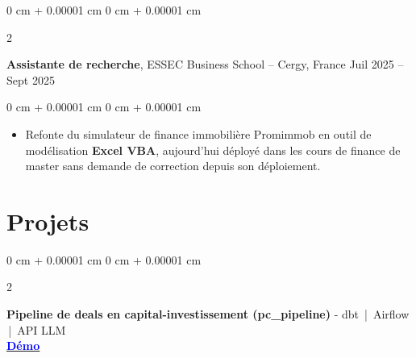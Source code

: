 \documentclass[10pt, letterpaper]{article}
\newenvironment{highlights}{
    \begin{itemize}[
        topsep=0.04 cm,
        parsep=0.02cm,
        partopsep=0pt,
        itemsep=0pt,
        leftmargin=0 cm + 10pt
    ]
}{
    \end{itemize}
} %
\newcommand{\stronglink}[2]{%
    \href{#1}{\textbf{\uline{\textcolor{blue}{#2}}}}%
}
\newenvironment{onecolentry}{
    \begin{adjustwidth}{
        0 cm + 0.00001 cm
    }{
        0 cm + 0.00001 cm
    }
}{
    \end{adjustwidth}
} %
\newenvironment{twocolentry}[2][]{
    \onecolentry
    \def\secondColumn{#2}
    \setcolumnwidth{\fill, 3.8 cm}
    \begin{paracol}{2}
}{
    \switchcolumn \raggedleft \secondColumn
    \end{paracol}
    \endonecolentry
} %
\begin{document}
    \vspace{0.2 cm}

        \begin{twocolentry}{
            Juil 2025 – Sept 2025
        }
            \textbf{Assistante de recherche}, ESSEC Business School -- Cergy, France\end{twocolentry}

        \vspace{0.10 cm}
        \begin{onecolentry}
            \begin{highlights}
                \item Refonte du simulateur de finance immobilière Promimmob en outil de modélisation \textbf{Excel VBA}, aujourd'hui déployé dans les cours de finance de master sans demande de correction depuis son déploiement.
            \end{highlights}
        \end{onecolentry}

\vspace{0.2 cm}


    \section{Projets}
        \begin{twocolentry}{
        \stronglink{https://krishuang-1116.github.io/private_capital_pipeline/}{Démo}
    }
        \textbf{Pipeline de deals en capital-investissement (pc\_pipeline)} -
        dbt \,|\, Airflow \,|\, API LLM \\
        \end{twocolentry}

        \vspace{0.10cm}
\end{document}
